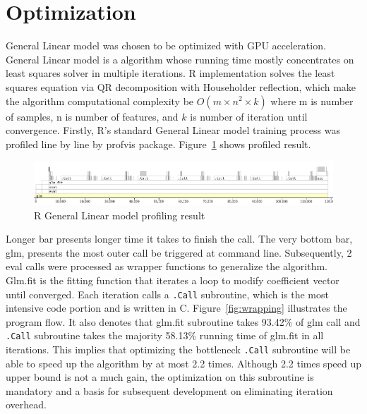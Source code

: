 \documentclass[English]{dicomopapers}
\begin{document}
\section{Optimization}
General Linear model was chosen to be optimized with GPU acceleration. General Linear model is a algorithm whose running time mostly concentrates on least squares solver in multiple iterations. R implementation solves the least squares equation via QR decomposition with Householder reflection, which make the algorithm computational complexity be \(O(m \times n ^ 2 \times k)\) where m is number of samples, n is number of features, and \(k\) is number of iteration until convergence.\newline
Firstly, R's standard General Linear model training process was profiled line by line by profvis package. Figure~\ref{fig:profvis} shows profiled result.\newline
\begin{figure}[ht]
  \vspace*{-1cm}
  \centering
  \includegraphics[width=\columnwidth,natwidth=1021,natheight=151]{profvis.png}
  \caption{R General Linear model profiling result}\label{fig:profvis}
\end{figure}
\newline
Longer bar presents longer time it takes to finish the call. The very bottom bar, glm, presents the most outer call be triggered at command line. Subsequently, 2 eval calls were processed as wrapper functions to generalize the algorithm. Glm.fit is the fitting function that iterates a loop to modify coefficient vector until converged. Each iteration calls a \texttt{.Call} subroutine, which is the most intensive code portion and is written in C. Figure~\ref{fig:wrapping} illustrates the program flow. It also denotes that glm.fit subroutine takes 93.42\% of glm call and \texttt{.Call} subroutine takes the majority 58.13\% running time of glm.fit in all iterations. This implies that optimizing the bottleneck \texttt{.Call} subroutine will be able to speed up the algorithm by at most 2.2 times. Although 2.2 times speed up upper bound is not a much gain, the optimization on this subroutine is mandatory and a basis for subsequent development on eliminating iteration overhead.\newline
\end{document}
